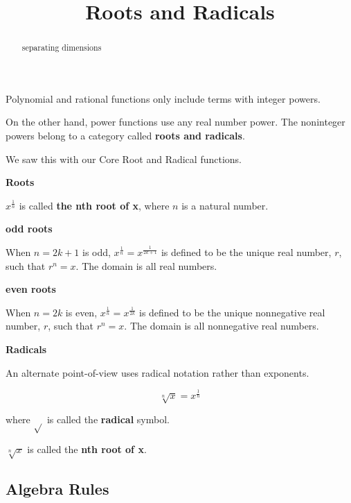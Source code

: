\documentclass{ximera}
\title{Roots and Radicals}
\begin{document}
\begin{abstract}
separating dimensions
\end{abstract}
\maketitle


Polynomial and rational functions only include terms with integer powers. 


On the other hand, power functions use any real number power.  The noninteger powers belong to a category called \textbf{roots and radicals}.

We saw this with our Core Root and Radical functions.

\begin{definition} \textbf{\textcolor{green!50!black}{Roots}}

$x^{\tfrac{1}{n}}$ is called \textbf{the nth root of x}, where $n$ is a natural number.




\textbf{odd roots}

When $n = 2k+1$ is odd, $x^{\tfrac{1}{n}} = x^{\tfrac{1}{2k+1}}$ is defined to be the unique real number, $r$, such that $r^n = x$. The domain is all real numbers.




\textbf{even roots}

When $n=2k$ is even, $x^{\tfrac{1}{n}} = x^{\tfrac{1}{2k}}$ is defined to be the unique nonnegative real number, $r$, such that $r^n = x$. The domain is all nonnegative real numbers.


\end{definition}


\begin{definition} \textbf{\textcolor{green!50!black}{Radicals}}

An alternate point-of-view uses radical notation rather than exponents.

\[   \sqrt[n]{x} =  x^{\tfrac{1}{n}}     \]

where $\sqrt{ }$ is called the \textbf{radical} symbol.


$\sqrt[n]{x}$ is called the \textbf{nth root of x}.

\end{definition}




\subsection*{Algebra Rules}
\end{document}
